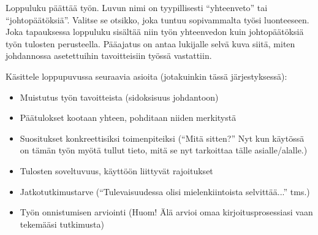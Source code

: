 Loppuluku päättää työn. Luvun nimi on tyypillisesti ``yhteenveto'' tai
``johtopäätöksiä''. Valitse se otsikko, joka tuntuu sopivammalta työsi
luonteeseen. Joka tapauksessa loppuluku sisältää niin työn yhteenvedon
kuin johtopäätöksiä työn tulosten perusteella. Pääajatus on antaa
lukijalle selvä kuva siitä, miten johdannossa asetettuihin
tavoitteisiin työssä vastattiin.

Käsittele loppupuvussa seuraavia asioita (jotakuinkin tässä järjestyksessä):
%
\begin{itemize}
  \item Muistutus työn tavoitteista (sidoksisuus johdantoon)
  \item Päätulokset kootaan yhteen, pohditaan niiden merkitystä
  \item Suositukset konkreettisiksi toimenpiteiksi (``Mitä sitten?'' 
Nyt kun käytössä on tämän työn myötä tullut tieto, 
mitä se nyt tarkoittaa tälle asialle/alalle.)
  \item Tulosten soveltuvuus, käyttöön liittyvät rajoitukset
  \item Jatkotutkimustarve 
(``Tulevaisuudessa olisi mielenkiintoista selvittää...'' tms.)
  \item Työn onnistumisen arviointi 
(Huom! Älä arvioi omaa kirjoitusprosessiasi vaan tekemääsi tutkimusta)
\end{itemize}


